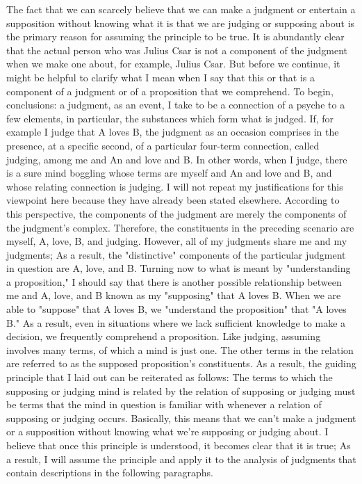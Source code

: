 \documentclass[a4paper,12pt]{book}[2004/02/16]
\theoremstyle{ilemma}
\theoremstyle{itheorem}
\theoremstyle{iother}
\theoremstyle{icorollary}
\theoremstyle{numcorollary}
\theoremstyle{idefinition}
\begin{document}
The fact that we can scarcely believe that we can make a judgment or entertain a supposition without knowing what it is that we are judging or supposing about is the primary reason for assuming the principle to be true. It is abundantly clear that the actual person who was Julius Csar is not a component of the judgment when we make one about, for example, Julius Csar. But before we continue, it might be helpful to clarify what I mean when I say that this or that is a component of a judgment or of a proposition that we comprehend. To begin, conclusions: a judgment, as an event, I take to be a connection of a
psyche to a few elements, in particular, the substances which form what is
judged. If, for example I judge that A loves B, the judgment as an occasion
comprises in the presence, at a specific second, of a particular
four-term connection, called judging, among me and An and love and B.
In other words, when I judge, there is a sure mind boggling
whose terms are myself and An and love and B, and whose relating
connection is judging. I will not repeat my justifications for this viewpoint here because they have already been stated elsewhere. According to this perspective, the components of the judgment are merely the components of the judgment's complex. Therefore, the constituents in the preceding scenario are myself, A, love, B, and judging. However, all of my judgments share me and my judgments; As a result, the "distinctive" components of the particular judgment in question are A, love, and B. Turning now to what is meant by "understanding a proposition," I should say that there is another possible relationship between me and A, love, and B known as my "supposing" that A loves B. When we are able to "suppose" that A loves B, we "understand the proposition" that "A loves B." As a result, even in situations where we lack sufficient knowledge to make a decision, we frequently comprehend a proposition.
Like judging, assuming involves many terms, of which a mind is just one. The other terms in the relation are referred to as the supposed proposition's constituents. As a result, the guiding principle that I laid out can be reiterated as follows: The terms to which the supposing or judging mind is related by the relation of supposing or judging must be terms that the mind in question is familiar with whenever a relation of supposing or judging occurs. Basically, this means that we can't make a judgment or a supposition without knowing what we're supposing or judging about. I believe that once this principle is understood, it becomes clear that it is true; As a result, I will assume the principle and apply it to the analysis of judgments that contain descriptions in the following paragraphs.
\end{document}
